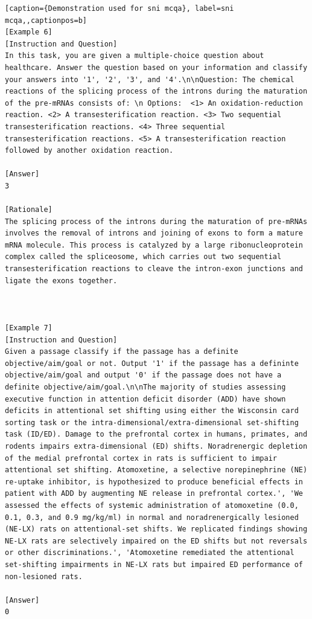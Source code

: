 \begin{lstlisting}[caption={Demonstration used for sni mcqa}, label=sni mcqa,,captionpos=b]
[Example 6]
[Instruction and Question]
In this task, you are given a multiple-choice question about healthcare. Answer the question based on your information and classify your answers into '1', '2', '3', and '4'.\n\nQuestion: The chemical reactions of the splicing process of the introns during the maturation of the pre-mRNAs consists of: \n Options:  <1> An oxidation-reduction reaction. <2> A transesterification reaction. <3> Two sequential transesterification reactions. <4> Three sequential transesterification reactions. <5> A transesterification reaction followed by another oxidation reaction.

[Answer]
3

[Rationale]
The splicing process of the introns during the maturation of pre-mRNAs involves the removal of introns and joining of exons to form a mature mRNA molecule. This process is catalyzed by a large ribonucleoprotein complex called the spliceosome, which carries out two sequential transesterification reactions to cleave the intron-exon junctions and ligate the exons together.



[Example 7]
[Instruction and Question]
Given a passage classify if the passage has a definite objective/aim/goal or not. Output '1' if the passage has a defininte objective/aim/goal and output '0' if the passage does not have a definite objective/aim/goal.\n\nThe majority of studies assessing executive function in attention deficit disorder (ADD) have shown deficits in attentional set shifting using either the Wisconsin card sorting task or the intra-dimensional/extra-dimensional set-shifting task (ID/ED). Damage to the prefrontal cortex in humans, primates, and rodents impairs extra-dimensional (ED) shifts. Noradrenergic depletion of the medial prefrontal cortex in rats is sufficient to impair attentional set shifting. Atomoxetine, a selective norepinephrine (NE) re-uptake inhibitor, is hypothesized to produce beneficial effects in patient with ADD by augmenting NE release in prefrontal cortex.', 'We assessed the effects of systemic administration of atomoxetine (0.0, 0.1, 0.3, and 0.9 mg/kg/ml) in normal and noradrenergically lesioned (NE-LX) rats on attentional-set shifts. We replicated findings showing NE-LX rats are selectively impaired on the ED shifts but not reversals or other discriminations.', 'Atomoxetine remediated the attentional set-shifting impairments in NE-LX rats but impaired ED performance of non-lesioned rats.

[Answer]
0


\end{lstlisting}
